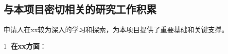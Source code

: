 \subsection{与本项目密切相关的研究工作积累}
申请人在xx较为深入的学习和探索，为本项目提供了重要基础和关键支撑。

\textcircled{\small 1} {\bfseries 在xx方面}：
